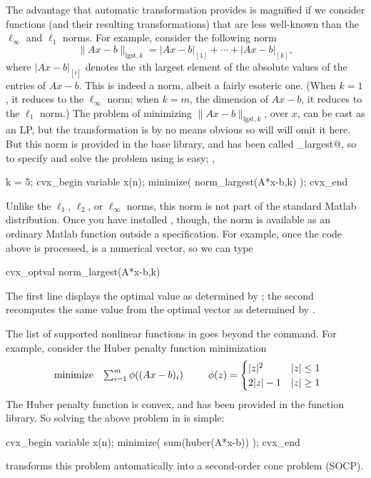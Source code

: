 \documentclass[12pt]{article}
\begin{document}
The advantage that automatic transformation provides
is magnified if we consider
functions (and their resulting transformations) that are less well-known than 
the $\ell_\infty$ and $\ell_1$ norms. For example, consider
the following norm
\[
\| Ax-b\|_{\mathrm{lgst},k} = |Ax-b|_{[1]}+ \cdots + |Ax-b|_{[k]},
\]
where $|Ax-b|_{[i]}$ denotes the $i$th largest element of the absolute
values of the entries of $Ax-b$.
This is indeed a norm, albeit a fairly esoteric one.
(When $k=1$, it reduces to the $\ell_\infty$ norm;
when $k=m$, the dimension of $Ax-b$, it reduces to the $\ell_1$ norm.)
The problem of minimizing $\| Ax-b\|_{\mathrm{lgst},k}$, over $x$,
can be cast as an LP, but the transformation is by no means obvious
so will will omit it here.
But this norm is provided in the base \cvx library, and has been
called \verb@norm_largest@, so to specify and solve
the problem using \cvx is easy; \eg,
\begin{code2}[firstnumber=179]
	k = 5;
	cvx_begin
	    variable x(n);
	    minimize( norm_largest(A*x-b,k) );
	cvx_end
\end{code2}
Unlike the $\ell_1$, $\ell_2$, or $\ell_\infty$ norms,
this norm is not part of the standard Matlab distribution.
Once you have installed \cvx, though, the norm is available as 
an ordinary Matlab function outside a \cvx specification.
For example, once the code above is processed, \verb@x@ is
a numerical vector, so we can type
\begin{code}
	cvx_optval
	norm_largest(A*x-b,k)
\end{code}
The first line displays the optimal value as determined by \cvx;
the second recomputes the same value from the optimal
vector \verb@x@ as determined by \cvx.

The list of supported nonlinear functions in \cvx 
goes beyond the \verb@norm@ command.
For example, consider the Huber penalty function minimization
\begin{equation}
	\begin{array}{ll}
		\text{minimize} & \sum_{i=1}^m \phi( (Ax-b)_i )
	\end{array} \qquad
	\phi(z) =\begin{cases}  |z|^2 & |z|\leq 1 \\ 2|z|-1 & |z|\geq 1  \end{cases}
\end{equation}
The Huber penalty function is convex, and has been provided in the \cvx
function library. So solving the above problem in \cvx is simple:
\begin{code2}[firstnumber=204]
	cvx_begin
	    variable x(n);
	    minimize( sum(huber(A*x-b)) );
	cvx_end
\end{code2}
\cvx transforms this problem automatically into a second-order cone problem
(SOCP).
\end{document}
